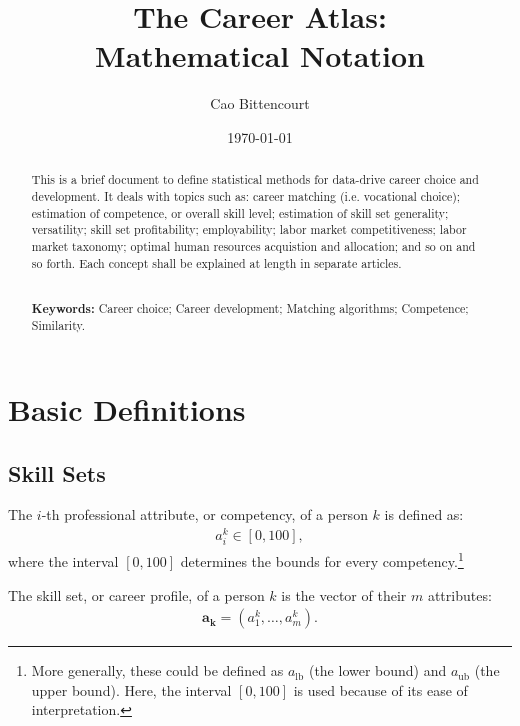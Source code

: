 \documentclass{elsarticle} %
\title{
    The Career Atlas:\\
    Mathematical Notation
}
\author{Cao Bittencourt}
\affiliation{{B. Sc. in Economics from EPGE (FGV), RJ, Brazil.}}
\affiliation{{Statistician at Atlas Career Guide Inc., FL, USA.}}
\date{\today}
\begin{document}

\begin{abstract}
    \noindent
    This is a brief document to define statistical methods for data-drive career choice and development. It deals with topics such as: career matching (i.e. vocational choice); estimation of competence, or overall skill level; estimation of skill set generality; versatility; skill set profitability; employability; labor market competitiveness; labor market taxonomy; optimal human resources acquistion and allocation; and so on and so forth. Each concept shall be explained at length in separate articles.

    \noindent
    \\ \textbf{Keywords:} Career choice; Career development; Matching algorithms; Competence; Similarity.
\end{abstract}

\maketitle


\tableofcontents
\newpage

\section{Basic Definitions}
\subsection{Skill Sets}
The $i$-th professional attribute, or competency, of a person $k$ is defined
as:
\begin{gather}
    a_{i}^{k}
    \in [0, 100]
    ,
\end{gather}
where the interval $[0,100]$ determines the bounds for every competency.\footnote[1]{
    More generally, these could be defined as $a_\text{lb}$ (the lower bound) and $a_\text{ub}$ (the upper bound). Here, the interval $[0,100]$ is used because of its ease of interpretation.
}

The skill set, or career profile, of a person $k$ is the vector of their $m$
attributes:
\begin{gather}
    \boldsymbol{a_k} = (a_{1}^{k}, \dots, a_{m}^{k})
    .
\end{gather}
\end{document}
